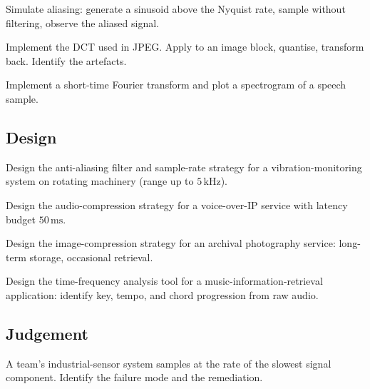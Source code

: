 \begin{exercise}
Simulate aliasing: generate a sinusoid above the Nyquist rate, sample without filtering, observe the aliased signal.
\end{exercise}

\begin{exercise}
Implement the DCT used in JPEG. Apply to an image block, quantise, transform back. Identify the artefacts.
\end{exercise}

\begin{exercise}
Implement a short-time Fourier transform and plot a spectrogram of a speech sample.
\end{exercise}

\subsection*{Design}

\begin{exercise}
Design the anti-aliasing filter and sample-rate strategy for a vibration-monitoring system on rotating machinery (range up to $5\,\si{\kilo\hertz}$).
\end{exercise}

\begin{exercise}
Design the audio-compression strategy for a voice-over-IP service with latency budget $50\,\si{\milli\second}$.
\end{exercise}

\begin{exercise}
Design the image-compression strategy for an archival photography service: long-term storage, occasional retrieval.
\end{exercise}

\begin{exercise}
Design the time-frequency analysis tool for a music-information-retrieval application: identify key, tempo, and chord progression from raw audio.
\end{exercise}

\subsection*{Judgement}

\begin{exercise}
A team's industrial-sensor system samples at the rate of the slowest signal component. Identify the failure mode and the remediation.
\end{exercise}


